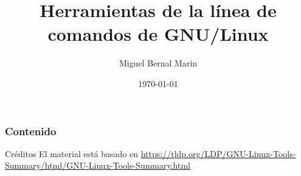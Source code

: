 \documentclass[aspectratio=169]{beamer}
\title[Línea de comandos de Linux]{Herramientas de la línea de comandos de GNU/Linux}
\author{Miguel Bernal Marin}
\institute[Escuela]
{
 Nombre de la Institución\\
\medskip
\textit{correo}
}
\date{
    \today
} %
\begin{document}
\begin{frame}
    \titlepage
\end{frame}

\begin{frame}
    \frametitle{Contenido}
    \tableofcontents
\end{frame}



\begin{frame}[c]{Créditos}
  El material está basado en
  \href{https://tldp.org/LDP/GNU-Linux-Tools-Summary/html/GNU-Linux-Tools-Summary.html}{https://tldp.org/LDP/GNU-Linux-Tools-Summary/html/GNU-Linux-Tools-Summary.html}
\end{frame}
\end{document}
